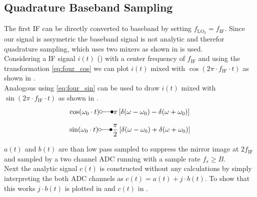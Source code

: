 \subsection{Quadrature Baseband Sampling}
\label{sec:rx_adc_1}
The first \gls{IF} can be directly converted to baseband by
setting $f_{\text{LO}_2} = f_{\text{IF}}$.
Since our signal is assymetric the baseband signal is not analytic
and therefor quadrature sampling, which uses two mixers as shown in
 is used. \\

Considering a \gls{IF} signal $i(t)$ ()
with a center frequency of $f_{\text{IF}}$
and using the transformation \eqref{eq:four_cos} we can plot
$i(t)$ mixed with $\cos(2\pi \cdot f_{\text{IF}} \cdot t)$ as shown in
. \\

Analogous using \eqref{eq:four_sin} can be used to draw $i(t)$ mixed with
$\sin(2\pi \cdot f_{\text{IF}} \cdot t)$ as shown in
. \\

\begin{align}
  \label{eq:four_cos}
  \cos(\omega_0 \cdot t) \laplace \pi
  \left[\delta(\omega - \omega_0) - \delta(\omega + \omega_0) \right]
\end{align}

\begin{align}
  \label{eq:four_sin}
  \sin(\omega_0 \cdot t) \laplace \frac{\pi}{2}
  \left[\delta(\omega - \omega_0) + \delta(\omega + \omega_0) \right]
\end{align}

$a(t)$ and $b(t)$ are than low pass sampled to suppress the mirror image
at $2 f_{\text{IF}}$ and sampled by a two channel \gls{ADC} running with a
sample rate $f_s \geq B$. \\

Next the analytic signal $c(t)$ is constructed without any calculations
by simply interpreting the both \gls{ADC} channels as
$c(t) = a(t) + j \cdot b(t)$. To show that this works $j \cdot b(t)$
is plotted in  and
$c(t)$ in .

